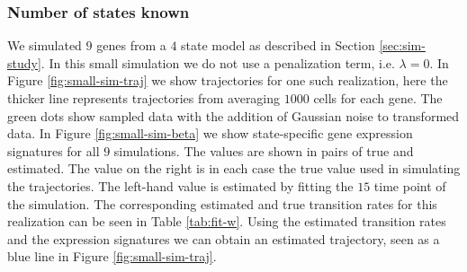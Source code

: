 \subsubsection{Number of states known}
\label{sec:number-states-known}

We simulated $9$ genes from a $4$ state model as described in Section \ref{sec:sim-study}. In this small simulation we do not use a penalization term, i.e. $\lambda=0$. In Figure \ref{fig:small-sim-traj} we show trajectories for one such realization, here the thicker line represents trajectories from averaging $1000$ cells for each gene. The green dots show sampled data with the addition of Gaussian noise to transformed data. In Figure \ref{fig:small-sim-beta} we show state-specific gene expression signatures for all $9$ simulations. The values are shown in pairs of true and estimated. The value on the right is in each case the true value used in simulating the trajectories. The left-hand value is estimated by fitting the $15$ time point of the simulation. The corresponding estimated and true transition rates for this realization can be seen in Table \ref{tab:fit-w}. Using the estimated transition rates and the expression signatures we can obtain an estimated trajectory, seen as a blue line in Figure \ref{fig:small-sim-traj}.

